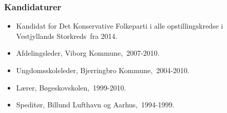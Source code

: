 \documentclass[11pt, a4paper]{awesome-cv}
\begin{document}
\begin{cvletter}
\subsubsection*{Kandidaturer}
\begin{itemize}
\item Kandidat for Det Konservative Folkeparti i alle opstillingskredse i Vestjyllands Storkreds fra 2014.
\end{itemize}
\begin{itemize}
\item Afdelingsleder, Viborg Kommune, 2007-2010.
\item Ungdomsskoleleder, Bjerringbro Kommune, 2004-2010.
\item Lærer, Bøgeskovskolen, 1999-2010.
\item Speditør, Billund Lufthavn og Aarhus, 1994-1999.
\end{itemize}
\end{cvletter}
\end{document}
